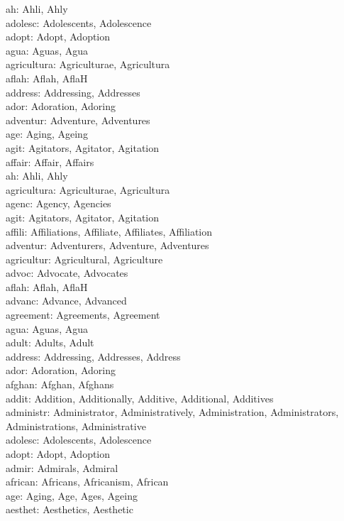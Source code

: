 \noindent
ah: Ahli, Ahly\\
adolesc: Adolescents, Adolescence\\
adopt: Adopt, Adoption\\
agua: Aguas, Agua\\
agricultura: Agriculturae, Agricultura\\
aflah: Aflah, AflaH\\
address: Addressing, Addresses\\
ador: Adoration, Adoring\\
adventur: Adventure, Adventures\\
age: Aging, Ageing\\
agit: Agitators, Agitator, Agitation\\



\noindent
affair: Affair, Affairs\\
ah: Ahli, Ahly\\
agricultura: Agriculturae, Agricultura\\
agenc: Agency, Agencies\\
agit: Agitators, Agitator, Agitation\\
affili: Affiliations, Affiliate, Affiliates, Affiliation\\
adventur: Adventurers, Adventure, Adventures\\
agricultur: Agricultural, Agriculture\\
advoc: Advocate, Advocates\\
aflah: Aflah, AflaH\\
advanc: Advance, Advanced\\
agreement: Agreements, Agreement\\
agua: Aguas, Agua\\
adult: Adults, Adult\\
address: Addressing, Addresses, Address\\
ador: Adoration, Adoring\\
afghan: Afghan, Afghans\\
addit: Addition, Additionally, Additive, Additional, Additives\\
administr: Administrator, Administratively, Administration, Administrators, Administrations, Administrative\\
adolesc: Adolescents, Adolescence\\
adopt: Adopt, Adoption\\
admir: Admirals, Admiral\\
african: Africans, Africanism, African\\
age: Aging, Age, Ages, Ageing\\
aesthet: Aesthetics, Aesthetic\\
